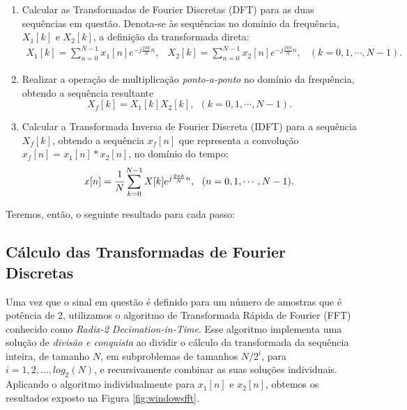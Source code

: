 \documentclass[a4paper,11pt]{article}
\numberwithin{figure}{section}
\numberwithin{equation}{section}
\numberwithin{table}{section}
\theoremstyle{definition}
\begin{document}
\begin{enumerate}
	\item Calcular as Transformadas de Fourier Discretas (DFT) para as duas sequências em questão. Denota-se às sequências no domínio da frequência, $X_1[k]$ e $X_2[k]$, a definição da transformada direta:
	\begin{equation}
	\begin{matrix}
		X_1[k] = \displaystyle\sum_{n = 0}^{N-1} x_1[n] e^{-j\frac{2\pi k}{N}n}, &
		X_2[k] = \displaystyle\sum_{n = 0}^{N-1} x_2[n] e^{-j\frac{2\pi k}{N}n}, & (k = 0,1,\cdots,N-1).
	\end{matrix}
	\end{equation}
	
	\item Realizar a operação de multiplicação \textit{ponto-a-ponto} no domínio da frequência, obtendo a sequência resultante
	\begin{equation}
		X_{f}[k] = X_1[k] X_2[k],\ \ (k = 0, 1, \cdots, N-1).
	\end{equation}
	
	\item Calcular a Transformada Inversa de Fourier Discreta (IDFT) para a sequência $X_{f}[k]$, obtendo a sequência $x_f[n]$ que representa a convolução $x_f[n] = x_1[n] * x_2[n]$, no domínio do tempo:
	\begin{equation}
		x[n] = \cfrac{1}{N} \displaystyle\sum_{k = 0}^{N-1} X[k] e^{j\frac{2\pi k}{N}n},\ \ (n = 0, 1, \cdots, N-1).
	\end{equation}
\end{enumerate}

\noindent Teremos, então, o seguinte resultado para cada passo:

\subsection{Cálculo das Transformadas de Fourier Discretas}

Uma vez que o sinal em questão é definido para um número de amostras que é potência de 2, utilizamos o algoritmo de Transformada Rápida de Fourier (FFT) conhecido como \textit{Radix-2 Decimation-in-Time}. Esse algoritmo implementa uma solução de \textit{divisão e conquista} ao dividir o cálculo da transformada da sequência inteira, de tamanho $N$, em subproblemas de tamanhos $N/2^i$, para $i = 1,2,..., log_2(N)$, e recursivamente combinar as suas soluções individuais. Aplicando o algoritmo individualmente para $x_1[n]$ e $x_2[n]$, obtemos os resultados exposto na Figura \ref{fig:windowsfft}.
\end{document}
